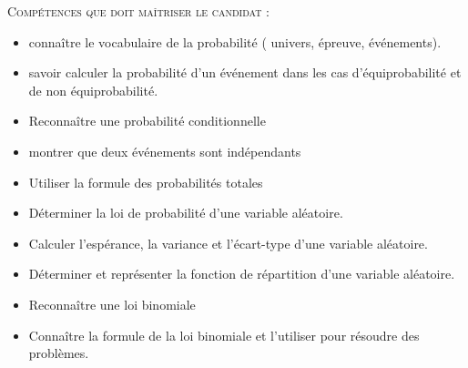 
 


 \summary{}
 
 \textsc{Compétences que doit maîtriser le candidat :}
\begin{itemize}[label=\bf $ \ast $]
  \item  connaître le  vocabulaire de la probabilité ( univers, épreuve, événements).
  \item savoir calculer la probabilité d'un événement dans les cas d'équiprobabilité et de  non équiprobabilité.
  \item Reconnaître une probabilité conditionnelle
    \item  montrer que deux événements sont indépendants
 \item Utiliser la formule des probabilités totales
   \item Déterminer la loi de
probabilité d'une variable
aléatoire.
\item Calculer l'espérance, la
variance et l'écart-type
d'une variable aléatoire.
   \item Déterminer et représenter la
fonction de répartition d'une
variable aléatoire.
\item Reconnaître une loi binomiale
\item Connaître la formule de la
loi binomiale et l'utiliser
pour résoudre des
problèmes.
\end{itemize}
   \bigskip
   
